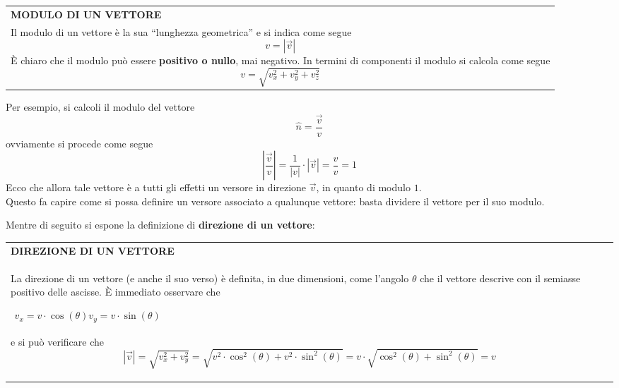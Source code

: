 \documentclass[a4paper]{extarticle}
\newcommand{\quotes}[1]{``#1''}
\renewcommand\arraystretch{}
\begin{document}
\vspace{1em}
\setlength{\tabcolsep}{14pt}
\renewcommand{\arraystretch}{2}
\noindent
\begin{tabularx}{\textwidth}{@{}|P|@{}}
    \hline
    {\textbf{MODULO DI UN VETTORE}}\\
    \parbox{\linewidth}{Il modulo di un vettore è la sua \quotes{lunghezza geometrica} e si indica come segue
    \[v = \left \vert \vec{v} \right \vert\]
    È chiaro che il modulo può essere \textbf{positivo o nullo}, mai negativo. In termini di componenti il modulo si calcola come segue
    \[v = \sqrt{v_x^2 + v_y^2 + v_z^2}\]
    \vspace{3mm}}\\
    \hline
\end{tabularx}

\vspace{1em}
\noindent
Per esempio, si calcoli il modulo del vettore
\[\hat{n} = \frac{\vec{v}}{v}\]
ovviamente si procede come segue
\[\left \vert \frac{\vec{v}}{v} \right \vert = \frac{1}{\left \vert v \right \vert} \cdot \left \vert \vec{v} \right \vert = \frac{v}{v} = 1\]
Ecco che allora tale vettore è a tutti gli effetti un versore in direzione $\vec{v}$, in quanto di modulo $1$.\\
Questo fa capire come si possa definire un versore associato a qualunque vettore: basta dividere il vettore per il suo modulo.

\vspace{1em}
\noindent
Mentre di seguito si espone la definizione di \textbf{direzione di un vettore}:

\vspace{1em}
\setlength{\tabcolsep}{14pt}
\renewcommand{\arraystretch}{2}
\noindent
\begin{tabularx}{\textwidth}{@{}|P|@{}}
    \hline
    {\textbf{DIREZIONE DI UN VETTORE}}\\
    \parbox{\linewidth}{La direzione di un vettore (e anche il suo verso) è definita, in due dimensioni, come l'angolo $\theta$ che il vettore descrive con il semiasse positivo delle ascisse.\\
    È immediato osservare che
    \begin{center}
      $\begin{array}{c}
        v_x = v \cdot \cos(\theta)\\
        v_y = v \cdot \sin(\theta)
      \end{array}$
    \end{center}
    e si può verificare che
    \[\left \vert \vec{v} \right \vert = \sqrt{v_x^2 + v_y^2} = \sqrt{v^2 \cdot \cos^2(\theta) + v^2 \cdot \sin^2(\theta)} = v \cdot \sqrt{\cos^2(\theta) + \sin^2(\theta)} = v\]
    \vspace{3mm}}\\
    \hline
\end{tabularx}
\end{document}
